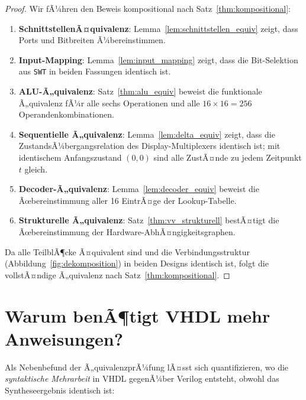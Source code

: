 ﻿\documentclass[12pt,a4paper]{report}
\begin{document}
\begin{proof}
	Wir fÃ¼hren den Beweis kompositional nach Satz~\ref{thm:kompositional}:
	
	\begin{enumerate}
		\item \textbf{SchnittstellenÃ¤quivalenz}: Lemma~\ref{lem:schnittstellen_equiv}
		zeigt, dass Ports und Bitbreiten Ã¼berein\-stimmen.
		\item \textbf{Input-Mapping}: Lemma~\ref{lem:input_mapping} zeigt, dass
		die Bit-Selektion aus \texttt{SWT} in beiden Fassungen identisch ist.
		\item \textbf{ALU-Ã„quivalenz}: Satz~\ref{thm:alu_equiv} beweist die
		funktionale Ã„quivalenz fÃ¼r alle sechs Operationen und alle
		$16 \times 16 = 256$ Operandenkombinationen.
		\item \textbf{Sequentielle Ã„quivalenz}: Lemma~\ref{lem:delta_equiv} zeigt,
		dass die ZustandsÃ¼bergangsrelation des Display-Multiplexers identisch
		ist; mit identischem Anfangszustand $(0,0)$ sind alle ZustÃ¤nde
		zu jedem Zeitpunkt $t$ gleich.
		\item \textbf{Decoder-Ã„quivalenz}: Lemma~\ref{lem:decoder_equiv} beweist
		die Ãœbereinstimmung aller 16 EintrÃ¤ge der Lookup-Tabelle.
		\item \textbf{Strukturelle Ã„quivalenz}: Satz~\ref{thm:vv_strukturell}
		bestÃ¤tigt die Ãœbereinstimmung der Hardware-AbhÃ¤ngigkeitsgraphen.
	\end{enumerate}
	
	Da alle TeilblÃ¶cke Ã¤quivalent sind und die Verbindungsstruktur
	(Abbildung~\ref{fig:dekomposition}) in beiden Designs identisch ist, folgt
	die vollstÃ¤ndige Ã„quivalenz nach Satz~\ref{thm:kompositional}.
\end{proof}

\section{Warum benÃ¶tigt VHDL mehr Anweisungen?}

Als Nebenbefund der Ã„quivalenzprÃ¼fung lÃ¤sst sich quantifizieren, wo die
\emph{syntaktische Mehrarbeit} in VHDL gegenÃ¼ber Verilog entsteht, obwohl das
Syntheseergebnis identisch ist:
\end{document}
